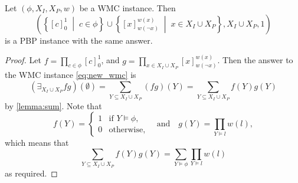 \documentclass[runningheads]{llncs}
\begin{document}
\begin{proposition} \label{prop:equivalence}
  Let $(\phi, X_I, X_P, w)$ be a WMC instance. Then
  \begin{equation}
  \left(\left\{[c]_0^1 \;\middle|\; c \in \phi\right\} \cup \left\{[x]_{w(\neg
        x)}^{w(x)} \;\middle|\; x \in X_I \cup X_P\right\}, X_I \cup X_P,
    1\right) \label{eq:new_wmc}
  \end{equation}
  is a PBP instance with the same answer.
\end{proposition}
\begin{proof}
  Let $f = \prod_{c \in \phi} [c]_0^1$, and $g = \prod_{x \in X_I \cup X_P}
  [x]_{w(\neg x)}^{w(x)}$. Then the answer to the WMC instance
  \eqref{eq:new_wmc} is
  \[
    (\exists_{X_I \cup X_P} fg)(\emptyset) = \sum_{Y \subseteq X_I \cup X_P}
    (fg)(Y) = \sum_{Y \subseteq X_I \cup X_P} f(Y)g(Y)
  \]
  by \cref{lemma:sum}. Note that
  \[
    f(Y) =
    \begin{cases}
      1 & \text{if } Y \models \phi, \\
      0 & \text{otherwise},
    \end{cases}
    \quad
    \text{and}
    \quad
    g(Y) = \prod_{Y \models l} w(l),
  \]
  which means that
  \[
    \sum_{Y \subseteq X_I \cup X_P} f(Y)g(Y) = \sum_{Y \models \phi} \prod_{Y
      \models l} w(l)
  \]
  as required.
\end{proof}
\end{document}
